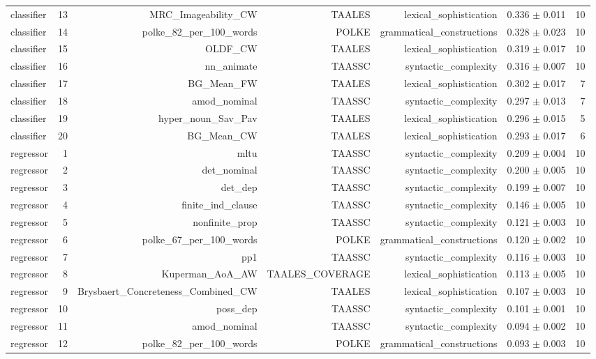 \begin{table}[t]
\begin{tabular}{lrrrrrr}
classifier & 13 & MRC\_Imageability\_CW & TAALES & lexical\_sophistication & 0.336 $\pm$ 0.011 & 10 \\
classifier & 14 & polke\_82\_per\_100\_words & POLKE & grammatical\_constructions & 0.328 $\pm$ 0.023 & 10 \\
classifier & 15 & OLDF\_CW & TAALES & lexical\_sophistication & 0.319 $\pm$ 0.017 & 10 \\
classifier & 16 & nn\_animate & TAASSC & syntactic\_complexity & 0.316 $\pm$ 0.007 & 10 \\
classifier & 17 & BG\_Mean\_FW & TAALES & lexical\_sophistication & 0.302 $\pm$ 0.017 & 7 \\
classifier & 18 & amod\_nominal & TAASSC & syntactic\_complexity & 0.297 $\pm$ 0.013 & 7 \\
classifier & 19 & hyper\_noun\_Sav\_Pav & TAALES & lexical\_sophistication & 0.296 $\pm$ 0.015 & 5 \\
classifier & 20 & BG\_Mean\_CW & TAALES & lexical\_sophistication & 0.293 $\pm$ 0.017 & 6 \\
regressor & 1 & mltu & TAASSC & syntactic\_complexity & 0.209 $\pm$ 0.004 & 10 \\
regressor & 2 & det\_nominal & TAASSC & syntactic\_complexity & 0.200 $\pm$ 0.005 & 10 \\
regressor & 3 & det\_dep & TAASSC & syntactic\_complexity & 0.199 $\pm$ 0.007 & 10 \\
regressor & 4 & finite\_ind\_clause & TAASSC & syntactic\_complexity & 0.146 $\pm$ 0.005 & 10 \\
regressor & 5 & nonfinite\_prop & TAASSC & syntactic\_complexity & 0.121 $\pm$ 0.003 & 10 \\
regressor & 6 & polke\_67\_per\_100\_words & POLKE & grammatical\_constructions & 0.120 $\pm$ 0.002 & 10 \\
regressor & 7 & pp1 & TAASSC & syntactic\_complexity & 0.116 $\pm$ 0.003 & 10 \\
regressor & 8 & Kuperman\_AoA\_AW & TAALES\_COVERAGE & lexical\_sophistication & 0.113 $\pm$ 0.005 & 10 \\
regressor & 9 & Brysbaert\_Concreteness\_Combined\_CW & TAALES & lexical\_sophistication & 0.107 $\pm$ 0.003 & 10 \\
regressor & 10 & poss\_dep & TAASSC & syntactic\_complexity & 0.101 $\pm$ 0.001 & 10 \\
regressor & 11 & amod\_nominal & TAASSC & syntactic\_complexity & 0.094 $\pm$ 0.002 & 10 \\
regressor & 12 & polke\_82\_per\_100\_words & POLKE & grammatical\_constructions & 0.093 $\pm$ 0.003 & 10 \\

\end{tabular}
\end{table}
